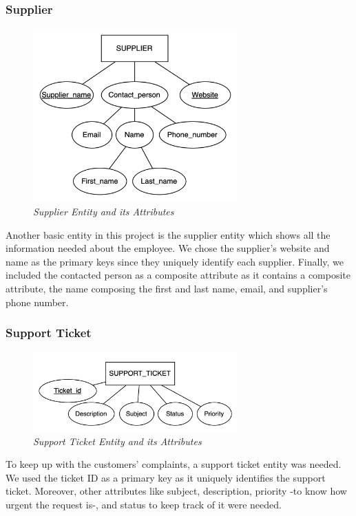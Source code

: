\documentclass[11pt]{article}
\begin{document}
\subsubsection{Supplier}
\begin{figure}[H]
  \centering
  \includegraphics[width=0.7\textwidth]{images/entities/supplier.png}
  \caption{\textit{Supplier Entity and its Attributes}}
\end{figure}

Another basic entity in this project is the supplier entity which shows all the information needed about the employee. We chose the supplier's website and name as the primary keys since they uniquely identify each supplier. Finally, we included the contacted person as a composite attribute as it contains a composite attribute, the name composing the first and last name, email, and supplier's phone number.

\subsubsection{Support Ticket}
\begin{figure}[H]
  \centering
  \includegraphics[width=0.7\textwidth]{images/entities/support_ticket.png}
  \caption{\textit{Support Ticket Entity and its Attributes}}
\end{figure}

To keep up with the customers' complaints, a support ticket entity was needed. We used the ticket ID as a primary key as it uniquely identifies the support ticket. Moreover, other attributes like subject, description, priority -to know how urgent the request is-, and status to keep track of it were needed.
\end{document}
